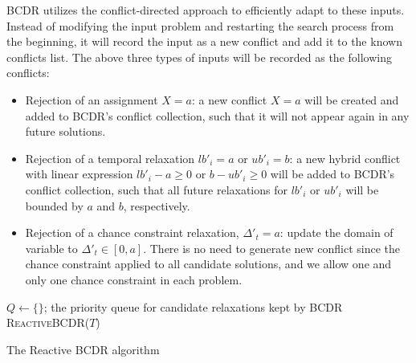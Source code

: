 \documentclass[jair,twoside,11pt,theapa]{article}
\let\oldnl\nl%
\newcommand{\nonl}{\renewcommand{\nl}{\let\nl\oldnl}}%
\begin{document}
BCDR utilizes the conflict-directed approach to efficiently adapt to these
inputs. Instead of modifying the input problem and restarting the search process from
the beginning, it will record the input as a new conflict and add it to the
known conflicts list. The above three types of inputs will be recorded as the
following conflicts:


\begin{itemize}
	
	\item Rejection of an assignment $X=a$: a new conflict $X=a$ will be created
	and added to BCDR's conflict collection, such that it will not appear again in
	any future solutions.
	
	
	\item Rejection of a temporal relaxation $lb'_i=a$ or $ub'_i=b$: a new
	hybrid conflict with linear expression $lb'_i-a \geq 0$ or $b-ub'_i \geq 0$ will be added to
	BCDR's conflict collection, such that all future relaxations for $lb'_i$ or
	$ub'_i$ will be bounded by $a$ and $b$, respectively.
	
	
	\item Rejection of a chance constraint relaxation, $\Delta'_t = a$: update the
	domain of variable to $\Delta'_t \in [0,a]$. There is no need to generate new
	conflict since the chance constraint applied to all candidate solutions, and we
	allow one and only one chance constraint in each problem.
	
\end{itemize}


\begin{algorithm}[h!]
	
	\SetAlgoLined
	\Indm
	\Initialize{}
	\;
	{$Q\leftarrow\{\}$; the priority queue for candidate relaxations kept by BCDR}\;
	\Indm
	\Algorithm{}
	\nonl\textsc{ReactiveBCDR}($\mathit{T}$)\\
	\Indp

\caption{The Reactive BCDR algorithm}
\label{alg:reactive_bcdr}
\end{algorithm}
\end{document}
